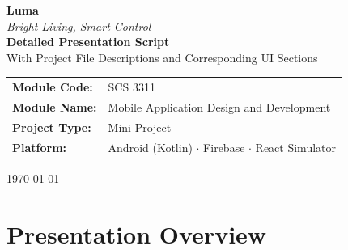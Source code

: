 \documentclass[11pt,a4paper]{article}
\begin{document}
\begin{titlepage}
\centering
\vspace*{1.5cm}

{\Huge\bfseries\color{lumasecondary} Luma}\\[0.3cm]
{\Large\itshape\color{lumaprimary} Bright Living, Smart Control}\\[1.2cm]

{\LARGE\bfseries Detailed Presentation Script}\\[0.35cm]
{\large With Project File Descriptions and Corresponding UI Sections}\\[1.5cm]

\begin{tabular}{ll}
\textbf{Module Code:} & SCS 3311 \\[4pt]
\textbf{Module Name:} & Mobile Application Design and Development \\[4pt]
\textbf{Project Type:} & Mini Project \\[4pt]
\textbf{Platform:} & Android (Kotlin) $\cdot$ Firebase $\cdot$ React Simulator \\[4pt]
\end{tabular}

\vspace{1.6cm}


\vfill
{\large \today}
\end{titlepage}

\newpage
\tableofcontents
\newpage

\section{Presentation Overview}
\end{document}
